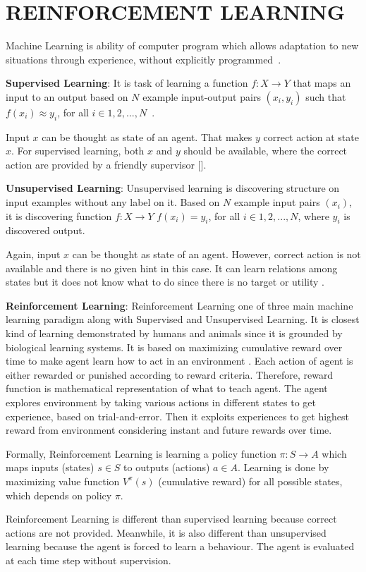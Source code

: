 \chapter{REINFORCEMENT LEARNING}

\label{chap:rl_chap}

Machine Learning is ability of computer program which allows adaptation to new situations through experience, without explicitly programmed~\cite{mitchell_machine_1997}.

\textbf{Supervised Learning}: It is task of learning a function $f \colon X \rightarrow Y$ that maps an input to an output based on $N$ example input-output pairs $(x_i,y_i)$ such that $ f(x_i) \approx y_i$, for all $i \in {1,2,...,N} $~\cite{russell_artificial_nodate}.

Input $x$ can be thought as state of an agent. That makes $y$ correct action at state $x$. For supervised learning, both $x$ and $y$ should be available, where the correct action are provided by a friendly supervisor []. 

\textbf{Unsupervised Learning}:
Unsupervised learning is discovering structure on input examples without any label on it. Based on $N$ example input pairs $(x_i)$, it is discovering function $f \colon X \rightarrow Y$ $ f(x_i) = y_i$, for all $i \in {1,2,...,N} $, where $y_i$ is discovered output. 

Again, input $x$ can be thought as state of an agent. However, correct action is not available and there is no given hint in this case. It can learn relations among states but it does not know what to do since there is no target or utility \cite{russell_artificial_nodate}.

\textbf{Reinforcement Learning}: Reinforcement Learning one of three main machine learning paradigm along with Supervised and Unsupervised Learning. It is closest kind of learning demonstrated by humans and animals since it is grounded by biological learning systems. It is based on maximizing cumulative reward over time to make agent learn how to act in an environment \cite{sutton_reinforcement_1998}. Each action of agent is either rewarded or punished according to reward criteria. Therefore, reward function is mathematical representation of what to teach agent. The agent explores environment by taking various actions in different states to get experience, based on trial-and-error. Then it exploits experiences to get highest reward from environment considering instant and future rewards over time. 

Formally, Reinforcement Learning is learning a policy function $\pi \colon S\rightarrow A$ which maps inputs (states) $s \in S$ to outputs (actions) $a \in A$. Learning is done by maximizing value function $V^{\pi}(s)$ (cumulative reward) for all possible states, which depends on policy $\pi$. 

Reinforcement Learning is different than supervised learning because correct actions are not provided. Meanwhile, it is also different than unsupervised learning because the agent is forced to learn a behaviour. The agent is evaluated at each time step without supervision.
